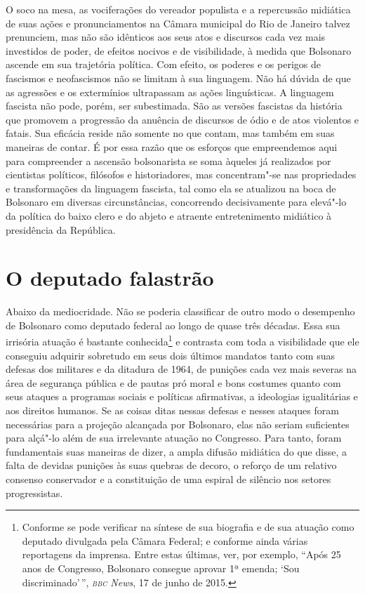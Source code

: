 O soco na mesa, as vociferações do vereador populista e a repercussão
midiática de suas ações e pronunciamentos na Câmara municipal do Rio de
Janeiro talvez prenunciem, mas não são idênticos aos seus atos e
discursos cada vez mais investidos de poder, de efeitos nocivos e de
visibilidade, à medida que Bolsonaro ascende em sua trajetória política.
Com efeito, os poderes e os perigos de fascismos e neofascismos não se
limitam à sua linguagem. Não há dúvida de que as agressões e os
extermínios ultrapassam as ações linguísticas. A linguagem fascista não
pode, porém, ser subestimada. São as versões fascistas da história que
promovem a progressão da anuência de discursos de ódio e de atos
violentos e fatais. Sua eficácia reside não somente no que contam, mas
também em suas maneiras de contar. É por essa razão que os esforços que
empreendemos aqui para compreender a ascensão bolsonarista se soma
àqueles já realizados por cientistas políticos, filósofos e
historiadores, mas concentram"-se nas propriedades e transformações da
linguagem fascista, tal como ela se atualizou na boca de Bolsonaro em
diversas circunstâncias, concorrendo decisivamente para elevá"-lo da
política do baixo clero e do abjeto e atraente entretenimento midiático
à presidência da República.

\section{O deputado falastrão}

Abaixo da mediocridade. Não se poderia classificar de outro modo o
desempenho de Bolsonaro como deputado federal ao longo de quase três
décadas. Essa sua irrisória atuação é bastante conhecida\footnote{Conforme
  se pode verificar na síntese de sua biografia e de sua atuação como
  deputado divulgada pela Câmara Federal; e conforme ainda várias reportagens da imprensa. Entre estas
  últimas, ver, por exemplo,
  ``Após 25 anos de Congresso, Bolsonaro consegue aprovar 1ª emenda; `Sou discriminado'\,'', \textit{\textsc{bbc} News}, 17 de junho de 2015.}
e contrasta com toda a visibilidade que ele conseguiu adquirir sobretudo
em seus dois últimos mandatos tanto com suas defesas dos militares e da
ditadura de 1964, de punições cada vez mais severas na área de segurança
pública e de pautas pró moral e bons costumes quanto com seus ataques a
programas sociais e políticas afirmativas, a ideologias igualitárias e
aos direitos humanos. Se as coisas ditas nessas defesas e nesses ataques
foram necessárias para a projeção alcançada por Bolsonaro, elas não
seriam suficientes para alçá"-lo além de sua irrelevante atuação no
Congresso. Para tanto, foram fundamentais suas maneiras de dizer, a
ampla difusão midiática do que disse, a falta de devidas punições às
suas quebras de decoro, o reforço de um relativo consenso conservador e
a constituição de uma espiral de silêncio nos setores progressistas.

